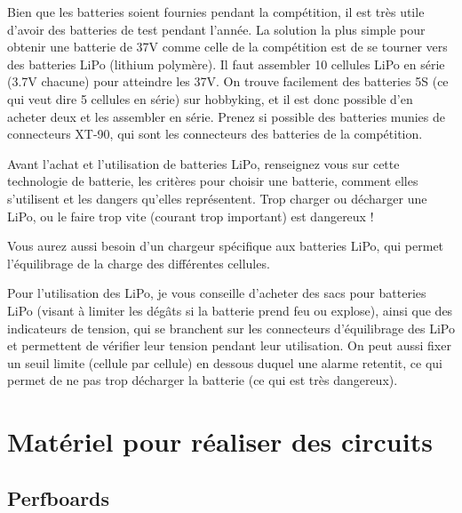 \documentclass[a4paper, 11pt]{report}
\begin{document}
Bien que les batteries soient fournies pendant la compétition, il
est très utile d'avoir des batteries de test pendant l'année. La solution
la plus simple pour obtenir une batterie de 37V comme celle de la
compétition est de se tourner vers des batteries LiPo (lithium polymère).
Il faut assembler 10 cellules LiPo en série (3.7V chacune) pour atteindre
les 37V. On trouve facilement des batteries 5S (ce qui veut dire 5
cellules en série) sur hobbyking, et il est donc possible d'en acheter
deux et les assembler en série. Prenez si possible des batteries munies
de connecteurs XT-90, qui sont les connecteurs des batteries de la
compétition.

Avant l'achat et l'utilisation de batteries LiPo, renseignez vous
sur cette technologie de batterie, les critères pour choisir une batterie,
comment elles s'utilisent et les dangers qu'elles représentent. Trop
charger ou décharger une LiPo, ou le faire trop vite (courant trop
important) est dangereux !

Vous aurez aussi besoin d'un chargeur spécifique aux batteries LiPo,
qui permet l'équilibrage de la charge des différentes cellules.

Pour l'utilisation des LiPo, je vous conseille d'acheter des sacs
pour batteries LiPo (visant à limiter les dégâts si la batterie prend
feu ou explose), ainsi que des indicateurs de tension, qui se branchent
sur les connecteurs d'équilibrage des LiPo et permettent de vérifier
leur tension pendant leur utilisation. On peut aussi fixer un seuil
limite (cellule par cellule) en dessous duquel une alarme retentit,
ce qui permet de ne pas trop décharger la batterie (ce qui est très
dangereux).

\chapter{Matériel pour réaliser des circuits}

\section{Perfboards}
\end{document}
